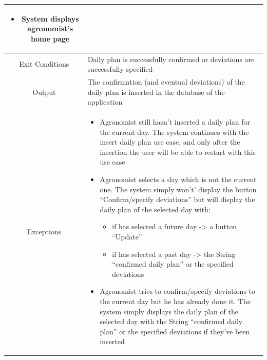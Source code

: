 \documentclass{article}
\begin{document}
\begin{center}
\begin{longtable}{|c| p{10cm}|}
\begin{itemize}
                                \item System displays agronomist’s home page
                            \end{itemize} \\
        \hline
            Exit Conditions & Daily plan is successfully confirmed or deviations are successfully specified \\
        \hline
            Output & The confirmation (and eventual deviations) of the daily plan is inserted in the database of the application\\
        \hline
            Exceptions & \begin{itemize}
                            \item Agronomist still hasn’t inserted a daily plan for the current day. The system continues with the insert daily plan use case, and only after the insertion the user will be able to restart with this use case
                            \item Agronomist selects a day which is not the current one. The system simply won't’ display the button “Confirm/specify deviations” but will display the daily plan of the selected day with:
                                    \begin{itemize}
                                        \item if has selected a future day -> a button “Update”
                                        \item if has selected a past day -> the String “confirmed daily plan” or the specified deviations 
                                    \end{itemize}

                            \item Agronomist tries to confirm/specify deviations to the current day but he has already done it. The system simply displays the daily plan of the selected day with the String “confirmed daily plan” or the specified deviations if they’ve been inserted
                        \end{itemize}\\
        \hline
    \end{longtable}
    

\end{center}
\end{document}
